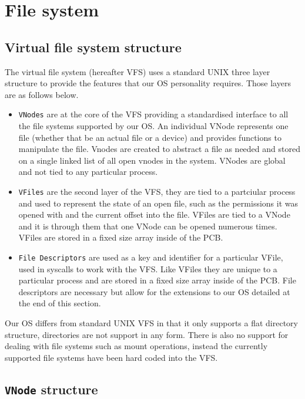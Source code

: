 \documentclass[12pt,english]{article}
\begin{document}

\section{File system}


\subsection{Virtual file system structure}

The virtual file system (hereafter VFS) uses a standard UNIX three layer structure to provide the features that our OS personality requires. Those layers are as follows below.

\begin{itemize}
\item \texttt{VNodes} are at the core of the VFS providing a standardised interface to all the file systems supported by our OS. An individual VNode represents one file (whether that be an actual file or a device) and provides functions to manipulate the file. Vnodes are created to abstract a file as needed and stored on a single linked list of all open vnodes in the system. VNodes are global and not tied to any particular process.
\item \texttt{VFiles} are the second layer of the VFS, they are tied to a partciular process and used to represent the state of an open file, such as the permissions it was opened with and the current offset into the file. VFiles are tied to a VNode and it is through them that one VNode can be opened numerous times. VFiles are stored in a fixed size array inside of the PCB.
\item \texttt{File Descriptors} are used as a key and identifier for a particular VFile, used in syscalls to work with the VFS. Like VFiles they are unique to a particular process and are stored in a fixed size array inside of the PCB. File descriptors are necessary but allow for the extensions to our OS detailed at the end of this section.
\end{itemize}

Our OS differs from standard UNIX VFS in that it only supports a flat directory structure, directories are not support in any form. There is also no support for dealing with file systems such as mount operations, instead the currently supported file systems have been hard coded into the VFS.

\subsection{\texttt{VNode} structure}
\end{document}
